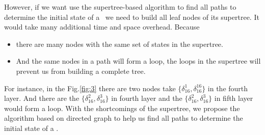 However, if we want use the supertree-based algorithm to find all paths to determine the initial state of a \BCN\ we need to build all leaf nodes of its supertree. It would take many additional time and space overhead. Because 
\begin{itemize}
 \item there are many nodes with the same set of states in the supertree.
 \item And the same nodes in a path will form a loop, the loops in the supertree will prevent us from building a complete tree.
 \end{itemize}
For instance, in the Fig.\ref{fig:3} there are two nodes take $\{\delta_{16}^1,\delta_{16}^{16}\}$ in the fourth layer. And there are the $\{\delta_{16}^2,\delta_{16}^3\}$ in fourth layer and the $\{\delta_{16}^2,\delta_{16}^3\}$ in fifth layer would form a loop. With the shortcomings of the supertree, we propose the algorithm based on directed graph to help us find all paths to determine the initial state of a \BCN.
